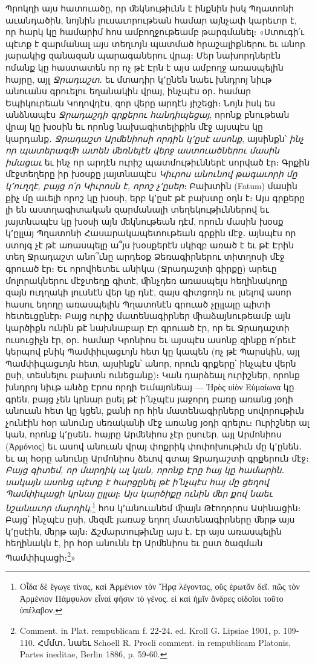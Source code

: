 \documentclass{article}
\begin{document}
{Պրոկղի այս հատուածը, որ ﬔկնութիւնն է ինքնին իսկ Պղատոնի աւանդածին, նոյնին լուսաւորութեան համար այնչափ կարեւոր է, որ հարկ կը համարիմ հոս ամբողջութեամբ թարգմանել։ «Ստուգի՛ւ պէտք է զարմանալ այս տեղւոյն պատմած հրաշալիքներու եւ անոր յարակից զանազան պարագաներու վրայ։ Մեր նախորդներէն ոմանք կը հաստատեն որ ոչ թէ Էրն է այս ամբողջ առասպելին հայրը, այլ \emph{Ջրադաշտ}․ եւ մտադիր կ՚ընեն նաեւ խնդրոյ նիւթ անուանս գրուելու եղանակին վրայ, ինչպէս օր․ համար Եպիկուրեան Կողովդէս, զոր վերը արդէն յիշեցի։ Նոյն իսկ ես անձնապէս \emph{Ջրադաշդի գրքերու հանդիպեցայ}, որոնք բնութեան վրայ կը խօսին եւ որոնց նախագիտելիքին մէջ այսպէս կը կարդանք․ \emph{Ջրադաշտ Արﬔնիոսի որդին կ՚ըսէ ասոնք}, այսինքն՝ \emph{ինչ որ պատերազﬕ ատեն ﬔռնելէն վերջ աստուածներու մասին իմացաւ} եւ ինչ որ արդէն ուրիշ պատմութիւններէ սորված էր։ Գրքին մէջտեղերը իր խօսքը յայտնապէս \emph{Կիւրոս անունով թագաւորի մը կ՚ուղղէ, բայց ո՛ր Կիւրոսն է, որոշ չ՚ըսեր}։ Բախտին (Fatum) մասին քիչ մը աւելի որոշ կը խօսի, երբ կ՚ըսէ թէ բախտը օդն է։ Այս գրքերը լի են աստղագիտական զարմանալի տեղեկութիւններով եւ յայտնապէս կը խօսի այն ﬔկնութեան դէմ, որուն մասին խօսք կ՚ըլլայ Պղատոնի Հասարակապետութեան գրքին մէջ․ այնպէս որ ստոյգ չէ թէ առասպելը ա՞յս խօսքերէն սկիզբ առած է եւ թէ Էրին տեղ Ջրադաշտ անո՞ւնը արդեօք Ձեռագիրներու տիտղոսի մէջ գրուած էր։ Եւ որովհետեւ անիկա (Ջրադաշտի գիրքը) արեւը մոլորակներու մէջտեղը գիտէ, ﬕնչդեռ առասպելս հեղինակողը զայն ուղղակի լուսնէն վեր կը դնէ, զայս գիտցողն ու լսելով ասոր հասու եղողը առասպելին Պղատոնէն գրուած չըլլալը պիտի հետեւցընէր։ Բայց ուրիշ մատենագիրներ ﬕաձայնութեամբ այն կարծիքն ունին թէ նախնաբար Էր գրուած էր, որ եւ Ջրադաշտի ուսուցիչն էր, օր․ համար Կրոնիոս եւ այսպէս ասոնք զինքը ո՛րեւէ կերպով բնիկ Պամփիւլացւոյն հետ կը կապեն (ոչ թէ Պարսկին, այլ Պամփիւլացւոյն հետ, այսինքն՝ անոր, որուն գրքերը՝ ինչպէս վերն ըսի, տեսնելու բախտն ունեցանք)։ Կան դարձեալ ուրիշներ, որոնք խնդրոյ նիւթ անձը Էրոս որդի Եւմայոնեայ — Ἠρὸς υἱὸν Εὐμαίωνα կը գրեն, բայց չեն կրնար ըսել թէ ի՛նչպէս յաջորդ բառը առանց յօդի անուան հետ կը կցեն, քանի որ հին մատենագիրները սովորութիւն չունէին հօր անունը սեռականի մէջ առանց յօդի գրելու։ Ուրիշներ ալ կան, որոնք կ՚ըսեն․ հայրը Արﬔնիոս չէր ըսուեր, այլ Արմոնիոս (Ἀρμόνιος) եւ ասով անուան վրայ փոքրիկ փոփոխութիւն մը կ՚ընեն․ եւ ալ հօրը անունը Արմոնիոս ձեւով գտայ Ջրադաշտի գրքերուն մէջ։ \emph{Բայց գիտեմ, որ մարդիկ ալ կան, որոնք Էրը հայ կը համարին․ սակայն ասոնց պէտք է հարցընել թէ ի՛նչպէս հայ մը ցեղով Պամփիւլացի կրնայ ըլլալ}։ \emph{Այս կարծիքը ունին ﬔր քով նաեւ նշանաւոր մարդիկ},\footnote{Οἶδα δὲ ἔγωγε τίνας, καὶ Ἀρμένιον τὸν Ἤρᾳ λέγοντας, οὕς ἐρωτᾶν δεῖ. πῶς τὸν Ἀρμένιον Πάμφυλον εἶναί φήσιν τὸ γένος. εἰ καὶ ἡμῖν ἄνδρες οἰδοῖοι τοῦτο ὑπέλαβον.} հոս կ՚անուանեմ ﬕայն Թէոդորոս Ասինացին։ Բայց՝ ինչպէս ըսի, ﬔզմէ յառաջ եղող մատենագիրները ﬔրթ այս կ՚ըսէին, ﬔրթ այն։ Ճշմարտութիւնը այս է․ Էր այս առասպելին հեղինակն է, իր հօր անունն էր Արﬔնիոս եւ ըստ ծագման Պամփիւլացի։\footnote{Comment. in Plat. rempublicam f. 22֊24. ed. Kroll G. Lipsiae 1901, p. 109֊110. Հմմտ․ նաեւ Schoell R. Procli comment. in rempublicam Platonis, Partes ineditae, Berlin 1886, p. 59֊60.}»

}
\end{document}
